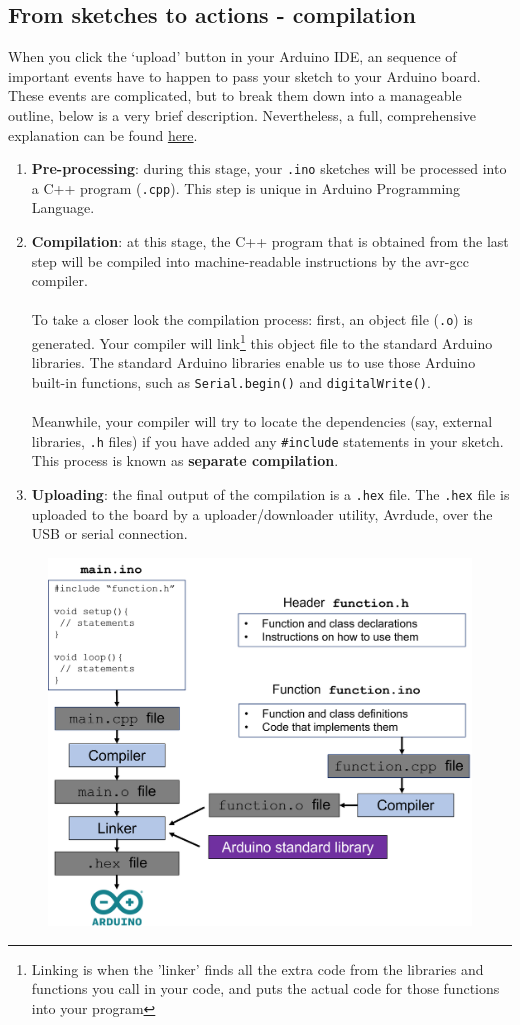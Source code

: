 \documentclass{article}
\begin{document}
\newpage
\begin{appendices}

\section{From sketches to actions - compilation}
When you click the `upload' button in your Arduino IDE, an sequence of important events have to happen to pass your sketch to your Arduino board. These events are complicated, but to break them down into a manageable outline, below is a very brief description. Nevertheless, a full, comprehensive explanation can be found \href{https://arduino.github.io/arduino-cli/0.21/sketch-build-process/}{here}.
\begin{enumerate}
    \item \textbf{Pre-processing}: during this stage, your \texttt{.ino} sketches will be processed into a C++ program (\texttt{.cpp}). This step is unique in Arduino Programming Language.
    \item \textbf{Compilation}: at this stage, the C++ program that is obtained from the last step will be compiled into machine-readable instructions by the avr-gcc compiler. \\\\To take a closer look the compilation process: first, an object file (\texttt{.o}) is generated. Your compiler will link\footnote{Linking is when the 'linker' finds all the extra code from the libraries and functions you call in your code, and puts the actual code for those functions into your program} this object file to the standard Arduino libraries. The standard Arduino libraries enable us to use those Arduino built-in functions, such as \texttt{Serial.begin()} and \texttt{digitalWrite()}. \\\\Meanwhile, your compiler will try to locate the dependencies (say, external libraries, \texttt{.h} files) if you have added any \texttt{\#include} statements in your sketch. This process is known as \textbf{separate compilation}. 
    \item \textbf{Uploading}: the final output of the compilation is a \texttt{.hex} file. The \texttt{.hex} file is uploaded to the board by a uploader/downloader utility, Avrdude, over the USB or serial connection.
\end{enumerate}
\begin{figure}[H]
    \centering
    \includegraphics[width=.65\textwidth]{compile.png}

\end{figure}
\end{appendices}
\end{document}
